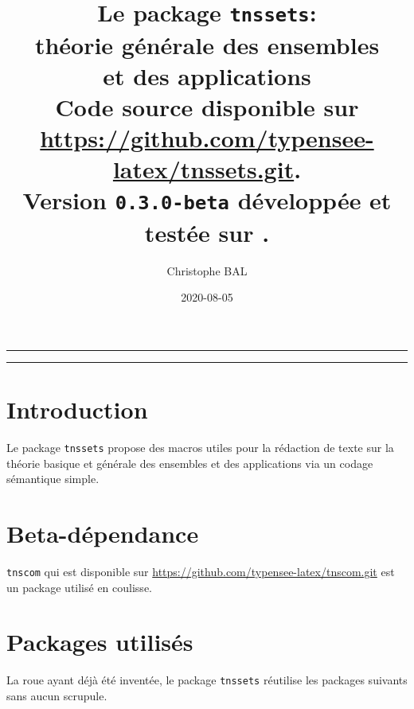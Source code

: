 \documentclass[12pt,a4paper]{article}
\theoremstyle{definition}
\begin{document}
\renewcommand\labelitemi{\raisebox{0.125em}{\tiny\textbullet}}
\renewcommand{\labelitemii}{---}

\title{  %
	Le package \texttt{tnssets}:\\%
	théorie générale des ensembles\\%
	et des applications\\%
	{\footnotesize Code source disponible sur \url{https://github.com/typensee-latex/tnssets.git}.}\\%
{\footnotesize Version \texttt{0.3.0-beta} développée et testée sur \macosxname{}.}%
}
\author{Christophe BAL}
\date{2020-08-05}

\maketitle


\vspace{2em}

\hrule

\tableofcontents

\vspace{1.5em}

\hrule

\newpage

\section{Introduction}

Le package \verb+tnssets+ propose des macros utiles pour la rédaction de texte sur la théorie basique et générale des ensembles et des applications via un codage sémantique simple.


\section{Beta-dépendance}

\verb#tnscom# qui est disponible sur \url{https://github.com/typensee-latex/tnscom.git} est un package utilisé en coulisse.
\section{Packages utilisés}

La roue ayant déjà été inventée, le package \verb#tnssets# réutilise les packages suivants sans aucun scrupule.
\end{document}
